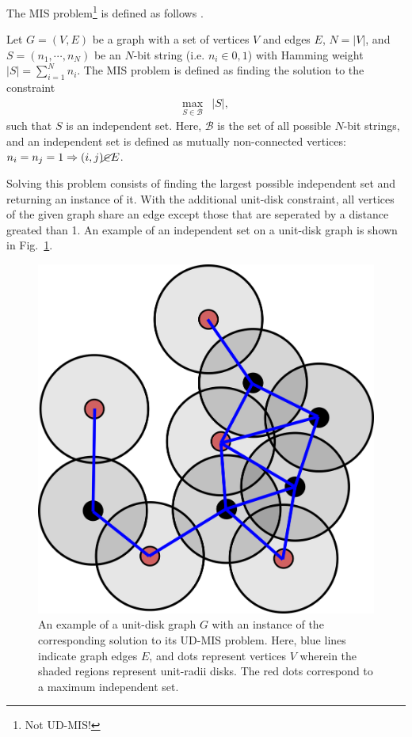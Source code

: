 \documentclass[12pt]{article}
\newenvironment{changemargin}[2]{%
\begin{list}{}{%
\setlength{\topsep}{0pt}%
\setlength{\leftmargin}{#1}%
\setlength{\rightmargin}{#2}%
\setlength{\listparindent}{\parindent}%
\setlength{\itemindent}{\parindent}%
\setlength{\parsep}{\parskip}%
}%
\item[]}{\end{list}}
\begin{document}
The MIS problem\footnote{Not UD-MIS!} is defined as follows \cite{serret_solving_2020}. \\

\begin{changemargin}{1.5cm}{1.5cm}
	\noindent Let $G = (V,E)$ be a graph with a set of vertices $V$ and edges $E$, $N = |V|$, and $S = (n_1, \dotsb, n_N)$ be an $N$-bit string (i.e. $n_i \in 0,1$) with Hamming weight $|S| = \sum_{i = 1}^N n_i$. 
	The MIS problem is defined as finding the solution to the constraint
	\begin{align*}
		\max_{S \in \mathcal{B}} & |S|,
	\end{align*}
	such that $S$ is an independent set.
	Here, $\mathcal{B}$ is the set of all possible $N$-bit strings, and an independent set is defined as mutually non-connected vertices: $n_i = n_j = 1 \Rightarrow (i,j) \cancel{\in} E$. \\
\end{changemargin}

Solving this problem consists of finding the largest possible independent set and returning an instance of it.
With the additional unit-disk constraint, all vertices of the given graph share an edge except those that are seperated by a distance greated than 1.
An example of an independent set on a unit-disk graph is shown in Fig.~\ref{fig:udmis_example}.

\begin{figure}
    \begin{center}
        \includegraphics[width=0.4\linewidth]{images/udmis_example.png}
    \end{center}
    \caption{An example of a unit-disk graph $G$ with an instance of the corresponding solution to its UD-MIS problem. Here, blue lines indicate graph edges $E$, and dots represent vertices $V$ wherein the shaded regions represent unit-radii disks. The red dots correspond to a maximum independent set.} \label{fig:udmis_example}
\end{figure}
\end{document}
